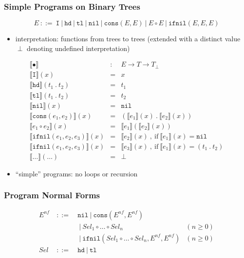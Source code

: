 \documentclass{beamer}
\begin{document}
\begin{frame}
  \frametitle{Simple Programs on Binary Trees}
  \[ E ~::=~ \texttt{I} ~|~ \texttt{hd} ~|~ \texttt{tl} ~|~ \texttt{nil}
       ~|~ \texttt{cons}(E, E)
       ~|~ E \circ E
       ~|~ \texttt{ifnil}(E, E, E)  \]
  \begin{itemize}
    \item interpretation: functions from trees to trees 
      (extended with a distinct value $\perp$ denoting undefined interpretation)
  \end{itemize}
  \[
    \begin{array}{lcl}
    \llbracket \bullet \rrbracket & : & E \rightarrow T \rightarrow T_{\perp} \\
    \llbracket \texttt{I} \rrbracket(x) & = & x \\
    \llbracket \texttt{hd} \rrbracket(t_1 ~.~ t_2) & = & t_1 \\
    \llbracket \texttt{tl} \rrbracket(t_1 ~.~ t_2) & = & t_2 \\
    \llbracket \texttt{nil} \rrbracket(x) & = & \texttt{nil} \\
    \llbracket \texttt{cons}(e_1, e_2) \rrbracket(x) & = & 
        (\llbracket e_1 \rrbracket(x) ~.~ \llbracket e_2 \rrbracket(x)) \\
    \llbracket e_1 \circ e_2 \rrbracket(x) & = & 
        \llbracket e_1 \rrbracket(\llbracket e_2 \rrbracket(x)) \\
    \llbracket \texttt{ifnil}(e_1, e_2, e_3) \rrbracket(x) & = & 
        \llbracket e_2 \rrbracket(x) ~,~ \text{if} ~ \llbracket e_1 \rrbracket(x) = \texttt{nil} \\
    \llbracket \texttt{ifnil}(e_1, e_2, e_3) \rrbracket(x) & = & 
        \llbracket e_3 \rrbracket(x) ~,~ \text{if} ~ \llbracket e_1 \rrbracket(x) = (t_1 ~.~ t_2) \\
    \llbracket \ldots \rrbracket(\ldots) & = & \perp
    \end{array}  
  \]
  \begin{itemize}
    \item ``simple'' programs: no loops or recursion
  \end{itemize}
\end{frame}

\begin{frame}
  \frametitle{Program Normal Forms}
  \[\begin{array}{lclr}
  E^{nf} & ~::=~ & \texttt{nil} ~|~ \texttt{cons}(E^{nf}, E^{nf}) & \\
         &       & ~|~ \mathit{Sel}_1 \circ \ldots \circ \mathit{Sel}_n & (n \ge 0) \\
         &       & ~|~ \texttt{ifnil}(\mathit{Sel}_1 \circ \ldots \circ \mathit{Sel}_n, E^{nf}, E^{nf}) & (n \ge 0) \\
  \mathit{Sel} & ~::=~ & \texttt{hd} ~|~ \texttt{tl} & 
  \end{array}
  \]
\end{frame}
\end{document}
